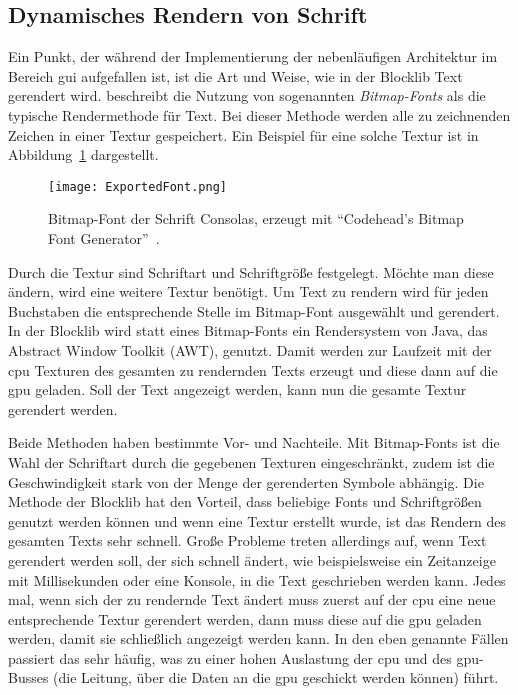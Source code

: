 \documentclass[12pt,a4paper,listof=toc,parskip=half,numbers=noenddot,abstract=true]{scrartcl}
\begin{document}
\subsection{Dynamisches Rendern von Schrift}
Ein Punkt, der während der Implementierung der nebenläufigen Architektur im Bereich \ac{gui} aufgefallen ist, ist die Art und Weise, wie in der Blocklib Text gerendert wird. \textcite{Vries2020} beschreibt die Nutzung von sogenannten \emph{Bitmap-Fonts} als die typische Rendermethode für Text. Bei dieser Methode werden alle zu zeichnenden Zeichen in einer Textur gespeichert. Ein Beispiel für eine solche Textur ist in Abbildung~\ref{fig:bitmapfont} dargestellt.
\begin{figure}[!htbp]
	\centering
	\texttt{[image: ExportedFont.png]}
	\caption[Bitmap-Font der Schrift Consolas.]{Bitmap-Font der Schrift Consolas, erzeugt mit \enquote{Codehead's Bitmap Font Generator}~\cite{Codehead2015}.}\label{fig:bitmapfont}
\end{figure}
Durch die Textur sind Schriftart und Schriftgröße festgelegt. Möchte man diese ändern, wird eine weitere Textur benötigt. Um Text zu rendern wird für jeden Buchstaben die entsprechende Stelle im Bitmap-Font ausgewählt und gerendert. In der Blocklib wird statt eines Bitmap-Fonts ein Rendersystem von Java, das Abstract Window Toolkit (AWT), genutzt. Damit werden zur Laufzeit mit der \ac{cpu} Texturen des gesamten zu rendernden Texts erzeugt und diese dann auf die \ac{gpu} geladen. Soll der Text angezeigt werden, kann nun die gesamte Textur gerendert werden.

Beide Methoden haben bestimmte Vor- und Nachteile. Mit Bitmap-Fonts ist die Wahl der Schriftart durch die gegebenen Texturen eingeschränkt, zudem ist die Geschwindigkeit stark von der Menge der gerenderten Symbole abhängig. Die Methode der Blocklib hat den Vorteil, dass beliebige Fonts und Schriftgrößen genutzt werden können und wenn eine Textur erstellt wurde, ist das Rendern des gesamten Texts sehr schnell. Große Probleme treten allerdings auf, wenn Text gerendert werden soll, der sich schnell ändert, wie beispielsweise ein Zeitanzeige mit Millisekunden oder eine Konsole, in die Text geschrieben werden kann. Jedes mal, wenn sich der zu rendernde Text ändert muss zuerst auf der \ac{cpu} eine neue entsprechende Textur gerendert werden, dann muss diese auf die \ac{gpu} geladen werden, damit sie schließlich angezeigt werden kann. In den eben genannte Fällen passiert das sehr häufig, was zu einer hohen Auslastung der \ac{cpu} und des \ac{gpu}-Busses (die Leitung, über die Daten an die \ac{gpu} geschickt werden können) führt.
\end{document}
